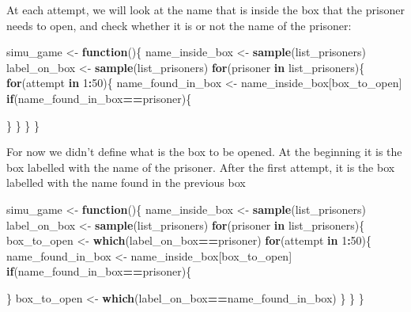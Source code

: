 \documentclass[]{book}
\newenvironment{Shaded}{\begin{snugshade}}{\end{snugshade}}
\newcommand{\ControlFlowTok}[1]{\textcolor[rgb]{0.13,0.29,0.53}{\textbf{#1}}}
\newcommand{\DecValTok}[1]{\textcolor[rgb]{0.00,0.00,0.81}{#1}}
\newcommand{\KeywordTok}[1]{\textcolor[rgb]{0.13,0.29,0.53}{\textbf{#1}}}
\newcommand{\NormalTok}[1]{#1}
\newcommand{\OperatorTok}[1]{\textcolor[rgb]{0.81,0.36,0.00}{\textbf{#1}}}
\newcommand{\StringTok}[1]{\textcolor[rgb]{0.31,0.60,0.02}{#1}}
\begin{document}
At each attempt, we will look at the name that is inside the box that the prisoner needs to open, and check whether it is or not the name of the prisoner:

\begin{Shaded}
\begin{Highlighting}[]
\NormalTok{simu_game <-}\StringTok{ }\ControlFlowTok{function}\NormalTok{()\{}
\NormalTok{  name_inside_box <-}\StringTok{ }\KeywordTok{sample}\NormalTok{(list_prisoners)}
\NormalTok{  label_on_box <-}\StringTok{ }\KeywordTok{sample}\NormalTok{(list_prisoners)}
  \ControlFlowTok{for}\NormalTok{(prisoner }\ControlFlowTok{in}\NormalTok{ list_prisoners)\{}
    \ControlFlowTok{for}\NormalTok{(attempt }\ControlFlowTok{in} \DecValTok{1}\OperatorTok{:}\DecValTok{50}\NormalTok{)\{}
\NormalTok{      name_found_in_box <-}\StringTok{ }\NormalTok{name_inside_box[box_to_open]}
      \ControlFlowTok{if}\NormalTok{(name_found_in_box}\OperatorTok{==}\NormalTok{prisoner)\{}
        
\NormalTok{      \}}
\NormalTok{    \}}
\NormalTok{  \}}
\NormalTok{\}}
\end{Highlighting}
\end{Shaded}

For now we didn't define what is the box to be opened. At the beginning it is the box labelled with the name of the prisoner. After the first attempt, it is the box labelled with the name found in the previous box

\begin{Shaded}
\begin{Highlighting}[]
\NormalTok{simu_game <-}\StringTok{ }\ControlFlowTok{function}\NormalTok{()\{}
\NormalTok{  name_inside_box <-}\StringTok{ }\KeywordTok{sample}\NormalTok{(list_prisoners)}
\NormalTok{  label_on_box <-}\StringTok{ }\KeywordTok{sample}\NormalTok{(list_prisoners)}
  \ControlFlowTok{for}\NormalTok{(prisoner }\ControlFlowTok{in}\NormalTok{ list_prisoners)\{}
\NormalTok{    box_to_open <-}\StringTok{ }\KeywordTok{which}\NormalTok{(label_on_box}\OperatorTok{==}\NormalTok{prisoner)}
    \ControlFlowTok{for}\NormalTok{(attempt }\ControlFlowTok{in} \DecValTok{1}\OperatorTok{:}\DecValTok{50}\NormalTok{)\{}
\NormalTok{      name_found_in_box <-}\StringTok{ }\NormalTok{name_inside_box[box_to_open]}
      \ControlFlowTok{if}\NormalTok{(name_found_in_box}\OperatorTok{==}\NormalTok{prisoner)\{}
        
\NormalTok{      \}}
\NormalTok{      box_to_open <-}\StringTok{ }\KeywordTok{which}\NormalTok{(label_on_box}\OperatorTok{==}\NormalTok{name_found_in_box) }
\NormalTok{    \}}
\NormalTok{  \}}
\NormalTok{\}}
\end{Highlighting}
\end{Shaded}
\end{document}
